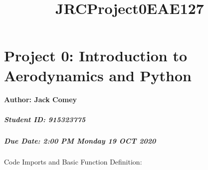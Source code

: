 \documentclass[11pt]{article}
\title{JRCProject0EAE127}
\begin{document}
    
    \maketitle
    
    

    
    \hypertarget{project-0-introduction-to-aerodynamics-and-python}{%
\section{Project 0: Introduction to Aerodynamics and
Python}\label{project-0-introduction-to-aerodynamics-and-python}}

\hypertarget{author-jack-comey}{%
\paragraph{Author: Jack Comey}\label{author-jack-comey}}

\hypertarget{student-id-915323775}{%
\subparagraph{Student ID: 915323775}\label{student-id-915323775}}

\hypertarget{due-date-200-pm-monday-19-oct-2020}{%
\subparagraph{Due Date: 2:00 PM Monday 19 OCT
2020}\label{due-date-200-pm-monday-19-oct-2020}}

Code Imports and Basic Function Definition:
\end{document}
